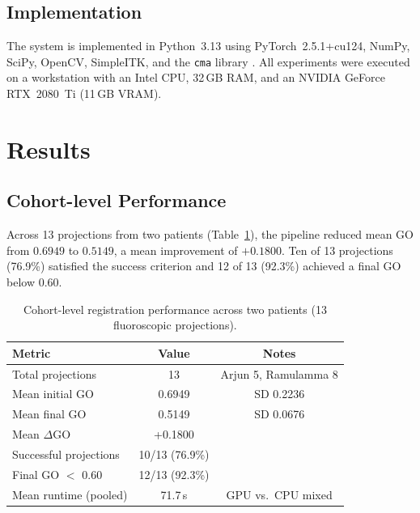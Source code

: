 \documentclass[10pt,a4paper]{article}
\begin{document}
\subsection{Implementation}
\label{sec:impl}

The system is implemented in Python~3.13 using PyTorch~2.5.1+cu124,
NumPy, SciPy, OpenCV, SimpleITK, and the \texttt{cma}
library \citep{Hansen2016}.
All experiments were executed on a workstation with an Intel CPU,
32\,GB RAM, and an NVIDIA GeForce RTX~2080~Ti (11\,GB VRAM).

\section{Results}
\label{sec:results}

\subsection{Cohort-level Performance}
\label{sec:cohort}

Across 13 projections from two patients
(Table~\ref{tab:cohort}), the pipeline reduced mean GO from
$0.6949$ to $0.5149$, a mean improvement of $+0.1800$.
Ten of 13 projections (76.9\%) satisfied the success criterion and
12 of 13 (92.3\%) achieved a final GO below 0.60.

\begin{table}[H]
\centering
\caption{%
  Cohort-level registration performance across two patients
  (13 fluoroscopic projections).}
\label{tab:cohort}
\begin{tabular}{lcc}
\toprule
\textbf{Metric} & \textbf{Value} & \textbf{Notes} \\
\midrule
Total projections              & 13     & Arjun 5, Ramulamma 8 \\
Mean initial GO                & 0.6949 & SD 0.2236 \\
Mean final GO                  & 0.5149 & SD 0.0676 \\
Mean $\Delta$GO                & +0.1800 & \\
Successful projections         & 10/13 (76.9\%) & \\
Final GO $<$ 0.60              & 12/13 (92.3\%) & \\
Mean runtime (pooled)          & 71.7\,s & GPU vs.\ CPU mixed \\
\bottomrule
\end{tabular}
\end{table}
\end{document}
